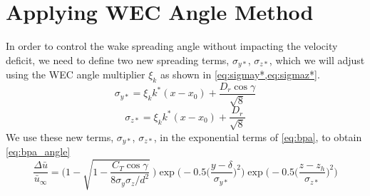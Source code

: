 \documentclass{article}
\begin{document}
	\section{Applying WEC Angle Method}
	In order to control the wake spreading angle without impacting the velocity deficit, we need to define two new spreading terms, $\sigma_{y*}$, $\sigma_{z*}$, which we will adjust using the WEC angle multiplier $\xi_k$ as shown in \cref{eq:sigmay*,eq:sigmaz*}.
	\begin{equation}\label{eq:sigmay*}
	\sigma_{y*} = \xi_k k^* (x - x_0) + \frac{D_r \cos{\gamma}}{\sqrt{8}}
	\end{equation}
	\begin{equation}\label{eq:sigmaz*}
	\sigma_{z*} = \xi_k k^* (x - x_0) + \frac{D_r}{\sqrt{8}}
	\end{equation}
	We use these new terms, $\sigma_{y*}$, $\sigma_{z*}$, in the exponential terms of \cref{eq:bpa}, to obtain \cref{eq:bpa_angle}
	\begin{equation}
	\frac{\Delta \bar{u}}{\bar{u}_{\infty}} = \Bigg(1-\sqrt{1-\frac{C_T \cos{\gamma}}{8 \sigma_y \sigma_z/d^2}}~\Bigg) \exp{\bigg(-0.5\Big(\frac{y-\delta}{\sigma_{y*}}\Big)^2\bigg)}\exp{\bigg(-0.5\Big(\frac{z-z_h}{\sigma_{z*}}\Big)^2\bigg)}
	\label{eq:bpa_angle}
	\end{equation}
	
	\newpage
	
	
	
	
	
	
	
	
	
	
	
\end{document}
